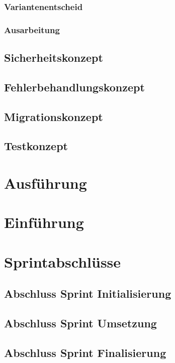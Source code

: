 \subsection{Variantenentscheid}
\subsection{Ausarbeitung}

\section{Sicherheitskonzept}
\section{Fehlerbehandlungskonzept}
\section{Migrationskonzept}
\section{Testkonzept}

\chapter{Ausführung}



\chapter{Einführung}

\chapter{Sprintabschlüsse}

\section{Abschluss Sprint Initialisierung}

\section{Abschluss Sprint Umsetzung}

\section{Abschluss Sprint Finalisierung}


